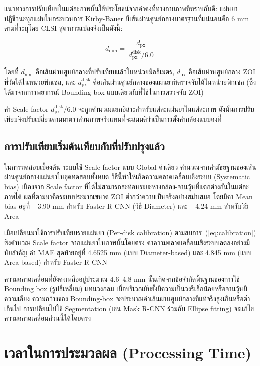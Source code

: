 แนวทางการปรับเทียบในแต่ละภาพนั้นใช้ประโยชน์จากค่าคงที่ทางกายภาพที่ทราบกันดี: แผ่นยาปฏิชีวนะทุกแผ่นในกระบวนการ Kirby-Bauer มีเส้นผ่านศูนย์กลางมาตรฐานที่แน่นอนคือ 6 mm ตามที่ระบุโดย CLSI \cite{clsi2025}
สูตรการแปลงจึงเป็นดังนี้:

\begin{equation}
  d_{\mathrm{mm}} = \frac{d_{\mathrm{px}}}{\,d^{\mathrm{disk}}_{\mathrm{px}} / 6.0\,}
  \label{eq:calibration}
\end{equation}

โดยที่ $d_{\mathrm{mm}}$ คือเส้นผ่านศูนย์กลางที่ปรับเทียบแล้วในหน่วยมิลลิเมตร,
$d_{\mathrm{px}}$ คือเส้นผ่านศูนย์กลาง ZOI ที่วัดได้ในหน่วยพิกเซล,
และ $d^{\mathrm{disk}}_{\mathrm{px}}$ คือเส้นผ่านศูนย์กลางของแผ่นยาที่ตรวจจับได้ในหน่วยพิกเซล
(ซึ่งได้มาจากการพยากรณ์ Bounding-box แบบเดียวกับที่ใช้ในการตรวจจับ ZOI)

ค่า Scale factor $d^{\mathrm{disk}}_{\mathrm{px}} / 6.0$ จะถูกคำนวณแยกอิสระสำหรับแต่ละแผ่นยาในแต่ละภาพ ดังนั้นการปรับเทียบจึงปรับเปลี่ยนตามมาตราส่วนภาพจริงแทนที่จะสมมติว่าเป็นการตั้งค่ากล้องแบบคงที่

\subsection{การปรับเทียบเริ่มต้นเทียบกับที่ปรับปรุงแล้ว}

ในการทดสอบเบื้องต้น ระบบใช้ Scale factor แบบ Global ค่าเดียว คำนวณจากค่ามัธยฐานของเส้นผ่านศูนย์กลางแผ่นยาในชุดทดสอบทั้งหมด
วิธีนี้ทำให้เกิดความคลาดเคลื่อนเชิงระบบ (Systematic bias) เนื่องจาก Scale factor ที่ได้ไม่สามารถสะท้อนระยะห่างกล้อง-จานวุ้นที่แตกต่างกันในแต่ละภาพได้
ผลที่ตามมาคือระบบประมาณขนาด ZOI ต่ำกว่าความเป็นจริงอย่างสม่ำเสมอ โดยมีค่า Mean bias อยู่ที่ $-$3.90 mm สำหรับ Faster R-CNN (วิธี Diameter) และ $-$4.24 mm สำหรับวิธี Area

เมื่อเปลี่ยนมาใช้การปรับเทียบรายแผ่นยา (Per-disk calibration) ตามสมการ~(\ref{eq:calibration}) ซึ่งคำนวณ Scale factor จากแผ่นยาในภาพนั้นโดยตรง ค่าความคลาดเคลื่อนเชิงระบบลดลงอย่างมีนัยสำคัญ
ค่า MAE สุดท้ายอยู่ที่ 4.6525 mm (แบบ Diameter-based) และ 4.845 mm (แบบ Area-based) สำหรับ Faster R-CNN

ความคลาดเคลื่อนที่ยังคงเหลืออยู่ประมาณ 4.6--4.8 mm นั้นเกิดจากข้อจำกัดพื้นฐานของการใช้ Bounding box (รูปสี่เหลี่ยม) แทนวงกลม
เมื่อบริเวณยับยั้งมีความเป็นวงรีเล็กน้อยหรือจานวุ้นมีความเอียง ความกว้างของ Bounding-box จะประมาณค่าเส้นผ่านศูนย์กลางที่แท้จริงสูงเกินหรือต่ำเกินไป
การเปลี่ยนไปใช้ Segmentation (เช่น Mask R-CNN ร่วมกับ Ellipse fitting) จะแก้ไขความคลาดเคลื่อนส่วนนี้ได้โดยตรง
\section{เวลาในการประมวลผล (Processing Time)}
\label{sec:processing_time}


